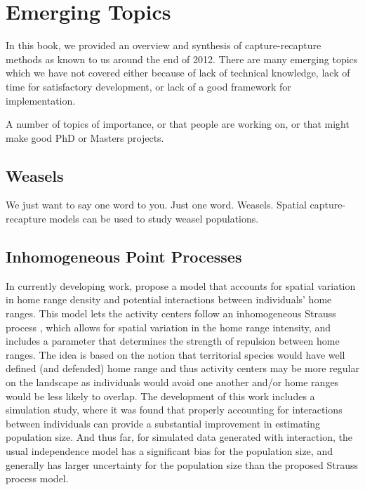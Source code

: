 \section{Emerging Topics}


In this book,
we provided an overview and synthesis of capture-recapture methods as
known to
us
around the end of 2012. There
are many emerging topics which we have not covered either because of lack
of technical knowledge, lack of time for satisfactory development, or lack of a good
framework for implementation.

A number of topics of importance, or that people are working on, or
that might make good PhD or Masters projects.

\subsection{Weasels} %

We just want to say one word to you. Just one word. Weasels. Spatial
capture-recapture models can be used to study weasel populations.


\subsection{Inhomogeneous Point Processes}

In currently developing work, \citet{reich_etal:2012}
propose a model that accounts for
spatial variation in home range density and potential interactions
between individuals' home ranges.  This model lets the activity
centers follow an inhomogeneous Strauss process
\citep{strauss:1975}, which allows for spatial variation
in the home range intensity, and includes a parameter that determines
the strength of repulsion between home ranges.   The idea is based on the notion
that territorial species would have well defined (and defended) home range and thus
activity centers may be more regular on the landscape as individuals would
avoid one another and/or home ranges would be less likely to overlap.
The development of this work includes a simulation study,
where it was found that properly accounting for interactions between
individuals can provide a substantial improvement in estimating
population size.  And thus far, for simulated data generated with interaction, the
usual independence model has a significant bias for the population
size, and generally has larger uncertainty for the population size
than the proposed Strauss process model.

